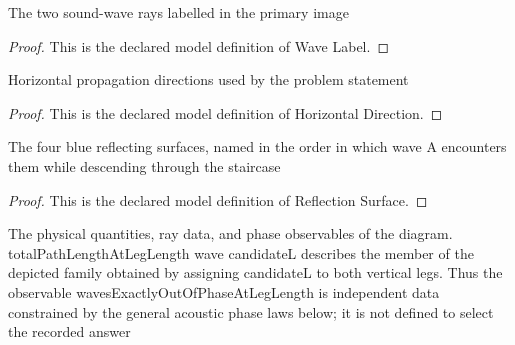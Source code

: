 \begin{definition}
  \label{def:physics:phyx-mini-0322:phyxminiproblems-problemphyxmini0322-wavelabel}
  The two sound-wave rays labelled in the primary image
\end{definition}
\begin{proof}
  This is the declared model definition of Wave Label.
\end{proof}
\begin{definition}
  \label{def:physics:phyx-mini-0322:phyxminiproblems-problemphyxmini0322-horizontaldirection}
  Horizontal propagation directions used by the problem statement
\end{definition}
\begin{proof}
  This is the declared model definition of Horizontal Direction.
\end{proof}
\begin{definition}
  \label{def:physics:phyx-mini-0322:phyxminiproblems-problemphyxmini0322-reflectionsurface}
  The four blue reflecting surfaces, named in the order in which wave A encounters them while descending through the staircase
\end{definition}
\begin{proof}
  This is the declared model definition of Reflection Surface.
\end{proof}
\begin{definition}
  \label{def:physics:phyx-mini-0322:phyxminiproblems-problemphyxmini0322-fourreflectionsoundsetup}
  The physical quantities, ray data, and phase observables of the diagram. totalPathLengthAtLegLength wave candidateL describes the member of the depicted family obtained by assigning candidateL to both vertical legs. Thus the observable wavesExactlyOutOfPhaseAtLegLength is independent data constrained by the general acoustic phase laws below; it is not defined to select the recorded answer
\end{definition}
